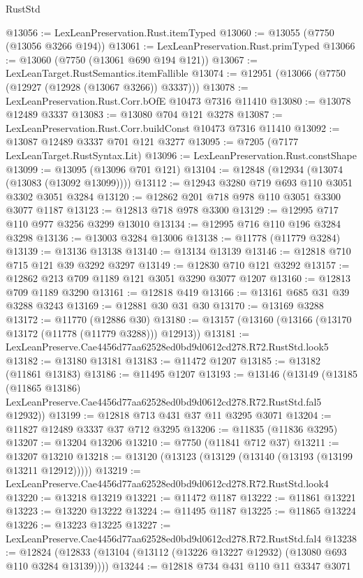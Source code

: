 \begin{lexlean}{RustStd}
\begin{coremodule}
@13056 := LexLeanPreservation.Rust.itemTyped
@13060 := @13055 (@7750 (@13056 @3266 @194))
@13061 := LexLeanPreservation.Rust.primTyped
@13066 := @13060 (@7750 (@13061 @690 @194 @121))
@13067 := LexLeanTarget.RustSemantics.itemFallible
@13074 := @12951 (@13066 (@7750 (@12927 (@12928 (@13067 @3266)) @3337)))
@13078 := LexLeanPreservation.Rust.Corr.bOfE @10473 @7316 @11410
@13080 := @13078 @12489 @3337
@13083 := @13080 @704 @121 @3278
@13087 := LexLeanPreservation.Rust.Corr.buildConst @10473 @7316 @11410
@13092 := @13087 @12489 @3337 @701 @121 @3277
@13095 := @7205 (@7177 LexLeanTarget.RustSyntax.Lit)
@13096 := LexLeanPreservation.Rust.constShape
@13099 := @13095 (@13096 @701 @121)
@13104 := @12848 (@12934 (@13074 (@13083 (@13092 @13099))))
@13112 := @12943 @3280 @719 @693 @110 @3051 @3302 @3051 @3284
@13120 := @12862 @201 @718 @978 @110 @3051 @3300 @3077 @1187
@13123 := @12813 @718 @978 @3300
@13129 := @12995 @717 @110 @977 @3256 @3299 @13010
@13134 := @12995 @716 @110 @196 @3284 @3298
@13136 := @13003 @3284 @13006
@13138 := @11778 (@11779 @3284)
@13139 := @13136 @13138
@13140 := @13134 @13139
@13146 := @12818 @710 @715 @121 @39 @3292 @3297
@13149 := @12830 @710 @121 @3292
@13157 := @12862 @213 @709 @1189 @121 @3051 @3290 @3077 @1207
@13160 := @12813 @709 @1189 @3290
@13161 := @12818 @419
@13166 := @13161 @685 @31 @39 @3288 @3243
@13169 := @12881 @30 @31 @30
@13170 := @13169 @3288
@13172 := @11770 (@12886 @30)
@13180 := @13157 (@13160 (@13166 (@13170 @13172 (@11778 (@11779 @3288))) @12913))
@13181 := LexLeanPreserve.Cae4456d77aa62528ed0bd9d0612cd278.R72.RustStd.look5
@13182 := @13180 @13181
@13183 := @11472 @1207
@13185 := @13182 (@11861 @13183)
@13186 := @11495 @1207
@13193 := @13146
    (@13149
      (@13185
        (@11865 @13186)
        LexLeanPreserve.Cae4456d77aa62528ed0bd9d0612cd278.R72.RustStd.fal5
        @12932))
@13199 := @12818 @713 @431 @37 @11 @3295 @3071
@13204 := @11827 @12489 @3337 @37 @712 @3295
@13206 := @11835 (@11836 @3295)
@13207 := @13204 @13206
@13210 := @7750 (@11841 @712 @37)
@13211 := @13207 @13210
@13218 := @13120 (@13123 (@13129 (@13140 (@13193 (@13199 @13211 @12912)))))
@13219 := LexLeanPreserve.Cae4456d77aa62528ed0bd9d0612cd278.R72.RustStd.look4
@13220 := @13218 @13219
@13221 := @11472 @1187
@13222 := @11861 @13221
@13223 := @13220 @13222
@13224 := @11495 @1187
@13225 := @11865 @13224
@13226 := @13223 @13225
@13227 := LexLeanPreserve.Cae4456d77aa62528ed0bd9d0612cd278.R72.RustStd.fal4
@13238 := @12824 (@12833 (@13104 (@13112 (@13226 @13227 @12932) (@13080 @693 @110 @3284 @13139))))
@13244 := @12818 @734 @431 @110 @11 @3347 @3071

\end{coremodule}
\end{lexlean}
